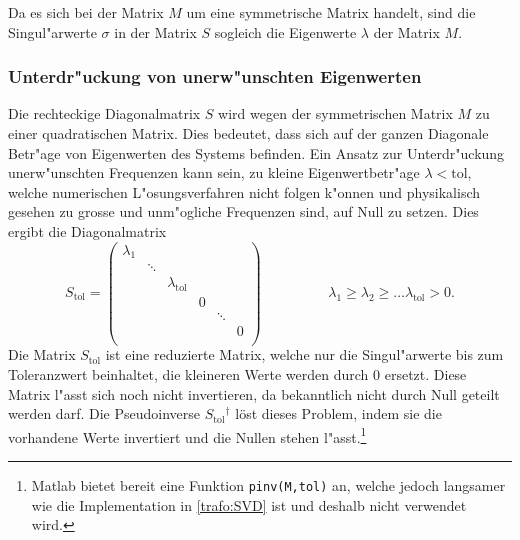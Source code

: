 \begin{refsection}
Da es sich bei der Matrix $M$ um eine symmetrische Matrix handelt, sind die Singul"arwerte $\sigma$ in der Matrix $S$ sogleich die Eigenwerte $\lambda$ der Matrix $M$.

\subsubsection{Unterdr"uckung von unerw"unschten Eigenwerten}
Die rechteckige Diagonalmatrix $S$ wird wegen der symmetrischen Matrix $M$ zu einer quadratischen Matrix. Dies bedeutet, dass sich auf der ganzen Diagonale Betr"age von Eigenwerten des Systems befinden. Ein Ansatz zur Unterdr"uckung unerw"unschten Frequenzen kann sein, zu kleine Eigenwertbetr"age $\lambda < \text{tol}$, welche numerischen L"osungsverfahren nicht folgen k"onnen und physikalisch gesehen zu grosse und unm"ogliche Frequenzen sind, auf Null zu setzen. Dies ergibt die Diagonalmatrix 
\begin{equation*}
	S_\text{tol} = \left( 
			\begin{array}{cccccc}
				\lambda_1 & & & & & \\
				& \ddots & & & &  \\
				& & \lambda_{\text{tol}} & & & \\
				& & & 0 & & \\
				& & & & \ddots & \\
				& & & & & 0 \\				
				\end{array}
			\right) 
			\hspace{2cm}\lambda_1 \geq \lambda_2 \geq \dots \lambda_{\text{tol}} > 0. 
\end{equation*}
Die Matrix $S_\text{tol}$ ist eine reduzierte Matrix, welche nur die Singul"arwerte bis zum Toleranzwert beinhaltet, die kleineren Werte werden durch $0$ ersetzt. Diese Matrix l"asst sich noch nicht invertieren, da bekanntlich nicht durch Null geteilt werden darf. Die Pseudoinverse $S{_\text{tol}}^\dagger$ löst dieses Problem, indem sie die vorhandene Werte invertiert und die Nullen stehen l"asst.\footnote{Matlab bietet bereit eine Funktion \texttt{pinv(M,tol)} an, welche jedoch langsamer wie die Implementation in \ref{trafo:SVD} ist und deshalb nicht verwendet wird.}


\end{refsection}
